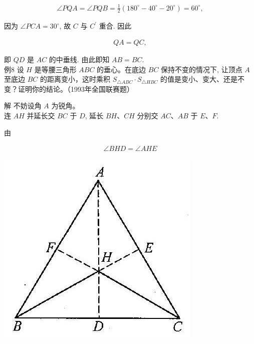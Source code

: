 \documentclass[10pt]{article}
\begin{document}
\begin{align*}
\angle P Q A=\angle P Q B=\frac{1}{2}\left(180^{\circ}-40^{\circ}-20^{\circ}\right)=60^{\circ},
\end{align*}

因为 $\angle P C A=30^{\circ}$, 故 $C$ 与 $C^{\prime}$ 重合. 因此

\begin{align*}
Q A=Q C,
\end{align*}

即 $Q D$ 是 $A C$ 的中垂线. 由此即知 $A B=B C$.\\
例8 设 $H$ 是等腰三角形 $A B C$ 的垂心。在底边 $B C$ 保持不变的情况下, 让顶点 $A$ 至底边 $B C$ 的距离变小，这时乘积 $S_{\triangle A B C} \cdot S_{\triangle H B C}$ 的值是变小、变大、还是不变？证明你的结论。（1993年全国联赛题）

解 不妨设角 $A$ 为锐角。\\
连 $A H$ 并延长交 $B C$ 于 $D$, 延长 $B H 、 C H$ 分别交 $A C 、 A B$ 于 $E 、 F$.

由

\begin{align*}
\angle B H D=\angle A H E
\end{align*}

\begin{center}
\includegraphics[max width=\textwidth]{2024_10_30_2c8f45efd4a519b08e1ag-069}
\end{center}
\end{document}
